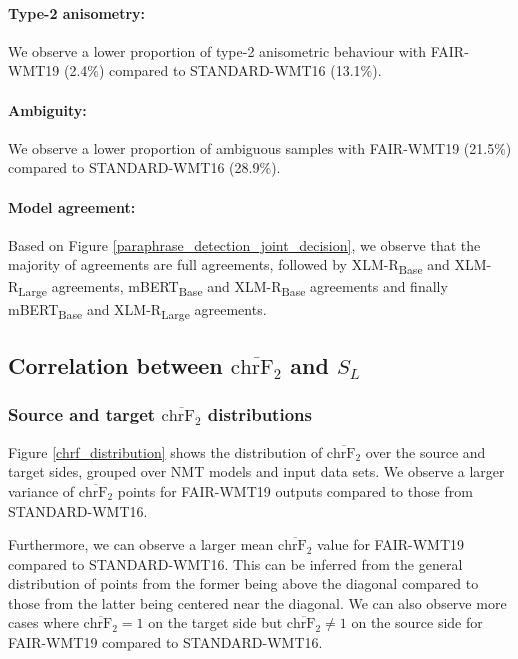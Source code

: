 \documentclass[11pt,a4paper]{article}
\begin{document}
\paragraph{Type-2 anisometry:} We observe a lower proportion of type-2
anisometric behaviour with FAIR-WMT19 (2.4$\%$) compared to STANDARD-WMT16
(13.1$\%$).
\paragraph{Ambiguity:} We observe a lower proportion of ambiguous samples with
FAIR-WMT19 (21.5$\%$) compared to STANDARD-WMT16 (28.9$\%$).
\paragraph{Model agreement:} Based on Figure
\ref{paraphrase_detection_joint_decision}, we observe that the majority of
agreements are full agreements, followed by XLM-R\textsubscript{Base} and
XLM-R\textsubscript{Large} agreements, mBERT\textsubscript{Base} and
XLM-R\textsubscript{Base} agreements and finally mBERT\textsubscript{Base} and
XLM-R\textsubscript{Large} agreements.

\subsection{Correlation between $\overline{\text{chrF}_2}$ and $S_L$}

\subsubsection{Source and target $\overline{\text{chrF}_2}$ distributions}

Figure \ref{chrf_distribution} shows the distribution of
$\overline{\text{chrF}_2}$ over the source and target sides, grouped over NMT
models and input data sets. We observe a larger variance of
$\overline{\text{chrF}_2}$ points for FAIR-WMT19 outputs compared to those from
STANDARD-WMT16.

Furthermore, we can observe a larger mean $\overline{\text{chrF}_2}$ value for
FAIR-WMT19 compared to STANDARD-WMT16. This can be inferred from the general
distribution of points from the former being above the diagonal compared to
those from the latter being centered near the diagonal. We can also observe more
cases where $\overline{\text{chrF}_2} = 1$ on the target side but
$\overline{\text{chrF}_2} \neq 1$ on the source side for FAIR-WMT19 compared to
STANDARD-WMT16.
\end{document}
